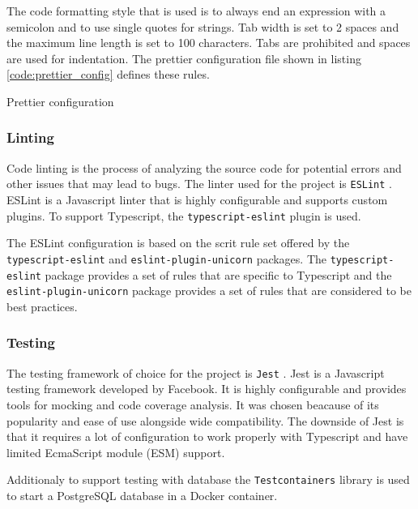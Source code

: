 \documentclass[../main.tex]{subfiles}
\begin{document}
The code formatting style that is used is to always end an expression with a semicolon and to use single quotes for strings.
Tab width is set to 2 spaces and the maximum line length is set to 100 characters. Tabs are prohibited and spaces are used for indentation.
The prettier configuration file shown in listing \ref{code:prettier_config} defines these rules.

\begin{listing}[H]
  \caption{Prettier configuration}
  \label{code:prettier_config}
\end{listing}


\subsubsection{Linting}

Code linting is the process of analyzing the source code for potential errors and other issues that may lead to bugs.
The linter used for the project is \texttt{ESLint} \cite{eslint}. ESLint is a Javascript linter that is highly configurable and supports custom plugins.
To support Typescript, the \texttt{typescript-eslint} \cite{typescript-eslint} plugin is used.

The ESLint configuration is based on the scrit rule set offered by the \texttt{typescript-eslint} and \texttt{eslint-plugin-unicorn} \cite{eslint-plugin-unicorn} packages.
The \texttt{typescript-eslint} package provides a set of rules that are specific to Typescript and the \texttt{eslint-plugin-unicorn} package provides a set of rules that are considered to be best practices.

\subsubsection{Testing}

The testing framework of choice for the project is \texttt{Jest} \cite{jest}. Jest is a Javascript testing framework developed by Facebook.
It is highly configurable and provides tools for mocking and code coverage analysis. It was chosen beacause of its popularity and ease of use alongside wide compatibility.
The downside of Jest is that it requires a lot of configuration to work properly with Typescript and have limited EcmaScript module (ESM) support.

Additionaly to support testing with database the \texttt{Testcontainers} \cite{testcontainers} library is used to start a PostgreSQL database in a Docker container.
\end{document}
